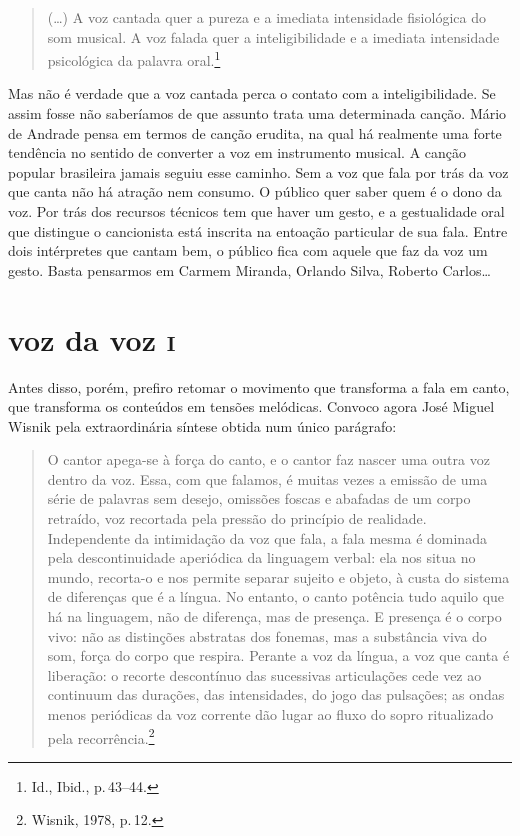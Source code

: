 \begin{quote}
(\ldots) A voz cantada quer a pureza e a imediata intensidade fisiológica
do som musical. A voz falada quer a inteligibilidade e a imediata
intensidade psicológica da palavra oral.\footnote{Id., Ibid., p.\,43--44.}
\end{quote}

Mas não é verdade que a voz cantada perca o contato com a
inteligibilidade. Se assim fosse não saberíamos de que assunto trata uma
determinada canção. Mário de Andrade pensa em termos de canção erudita,
na qual há realmente uma forte tendência no sentido de converter a voz
em instrumento musical. A canção popular brasileira jamais seguiu esse
caminho. Sem a voz que fala por trás da voz que canta não há atração nem
consumo. O público quer saber quem é o dono da voz. Por trás dos
recursos técnicos tem que haver um gesto, e a gestualidade oral que
distingue o cancionista está inscrita na entoação particular de sua
fala. Entre dois intérpretes que cantam bem, o público fica com aquele
que faz da voz um gesto. Basta pensarmos em Carmem Miranda, Orlando
Silva, Roberto Carlos\ldots

\section{voz da voz \textsc{i}}

Antes disso, porém, prefiro retomar o movimento que transforma a fala em
canto, que transforma os conteúdos em tensões melódicas. Convoco agora
José Miguel Wisnik pela extraordinária síntese obtida num único
parágrafo:

\begin{quote}
O cantor apega-se à força do canto, e o cantor faz nascer uma outra voz
dentro da voz. Essa, com que falamos, é muitas vezes a emissão de uma
série de palavras sem desejo, omissões foscas e abafadas de um corpo
retraído, voz recortada pela pressão do princípio de realidade.
Independente da intimidação da voz que fala, a fala mesma é dominada
pela descontinuidade aperiódica da linguagem verbal: ela nos situa no
mundo, recorta-o e nos permite separar sujeito e objeto, à custa do
sistema de diferenças que é a língua. No entanto, o canto potência tudo
aquilo que há na linguagem, não de diferença, mas de presença. E
presença é o corpo vivo: não as distinções abstratas dos fonemas, mas a
substância viva do som, força do corpo que respira. Perante a voz da
língua, a voz que canta é liberação: o recorte descontínuo das
sucessivas articulações cede vez ao continuum das durações, das
intensidades, do jogo das pulsações; as ondas menos periódicas da voz
corrente dão lugar ao fluxo do sopro ritualizado pela recorrência.\footnote{Wisnik, 1978, p.\,12.}
\end{quote}

